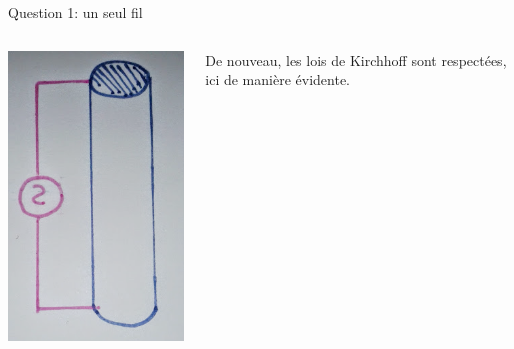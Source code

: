 \documentclass{beamer}
\begin{document}
\begin{frame}{Question 1: un seul fil}
	\begin{columns}
		\begin{column}{0.40\textwidth}
			\begin{center}
	    		\includegraphics[scale=0.2, angle=90]{Question1-2.png}
        		\end{center}
        	\end{column}
		\begin{column}{0.40\textwidth}
		De nouveau, les lois de Kirchhoff sont respectées, ici de manière évidente.
		\end{column}
	\end{columns}
\end{frame}
\end{document}
